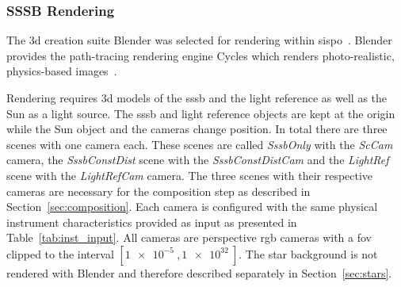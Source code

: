 \begin{table}[htb]
    \centering
    \caption{Input parameters that define the propagation step.}
    \label{tab:sim_prop_input}
\end{table}


\subsubsection{SSSB Rendering}
The \gls{3d} creation suite Blender was selected for rendering within \gls{sispo}~\cite{blender}. Blender provides the path-tracing rendering engine Cycles which renders photo-realistic, physics-based images~\cite{Cycles}.

Rendering requires \gls{3d} models of the \gls{sssb} and the light reference as well as the Sun as a light source. The \gls{sssb} and light reference objects are kept at the origin while the Sun object and the cameras change position. In total there are three scenes with one camera each. These scenes are called \textit{SssbOnly} with the \textit{ScCam} camera, the \textit{SssbConstDist} scene with the \textit{SssbConstDistCam} and the \textit{LightRef} scene with the \textit{LightRefCam} camera. The three scenes with their respective cameras are necessary for the composition step as described in Section~\ref{sec:composition}. Each camera is configured with the same physical instrument characteristics provided as input as presented in Table~\ref{tab:inst_input}. All cameras are perspective \gls{rgb} cameras with a \gls{fov} clipped to the interval $[\SI{1e-5}{},\SI{1e32}{}]$. The star background is not rendered with Blender and therefore described separately in Section~\ref{sec:stars}.

